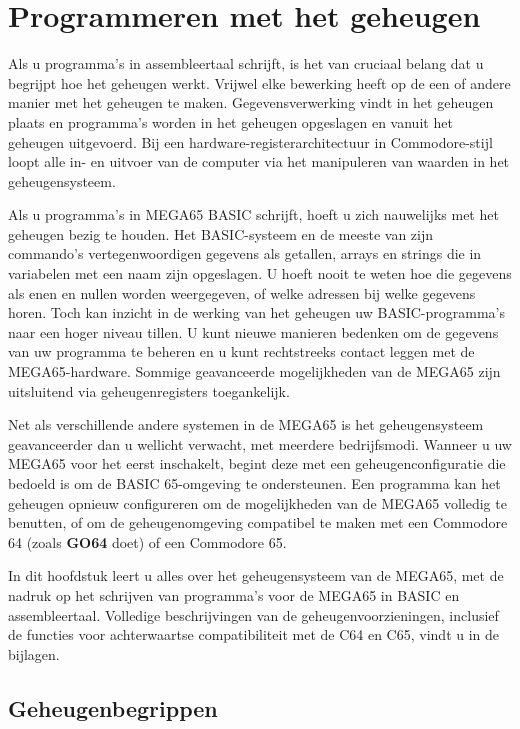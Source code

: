 
\chapter{Programmeren met het geheugen}
\label{cha:programming-with-memory}

Als u programma's in assembleertaal schrijft, is het van cruciaal belang dat u begrijpt hoe het geheugen werkt. Vrijwel elke bewerking heeft op de een of andere manier met het geheugen te maken. Gegevensverwerking vindt in het geheugen plaats en programma's worden in het geheugen opgeslagen en vanuit het geheugen uitgevoerd. Bij een hardware-registerarchitectuur in Commodore-stijl loopt alle in- en uitvoer van de computer via het manipuleren van waarden in het geheugensysteem.

Als u programma's in MEGA65 BASIC schrijft, hoeft u zich nauwelijks met het geheugen bezig te houden. Het BASIC-systeem en de meeste van zijn commando's vertegenwoordigen gegevens als getallen, arrays en strings die in variabelen met een naam zijn opgeslagen. U hoeft nooit te weten hoe die gegevens als enen en nullen worden weergegeven, of welke adressen bij welke gegevens horen. Toch kan inzicht in de werking van het geheugen uw BASIC-programma's naar een hoger niveau tillen. U kunt nieuwe manieren bedenken om de gegevens van uw programma te beheren en u kunt rechtstreeks contact leggen met de MEGA65-hardware. Sommige geavanceerde mogelijkheden van de MEGA65 zijn uitsluitend via geheugenregisters toegankelijk.

Net als verschillende andere systemen in de MEGA65 is het geheugensysteem geavanceerder dan u wellicht verwacht, met meerdere bedrijfsmodi. Wanneer u uw MEGA65 voor het eerst inschakelt, begint deze met een geheugenconfiguratie die bedoeld is om de BASIC 65-omgeving te ondersteunen. Een programma kan het geheugen opnieuw configureren om de mogelijkheden van de MEGA65 volledig te benutten, of om de geheugenomgeving compatibel te maken met een Commodore 64 (zoals \textbf{GO64} doet) of een Commodore 65.

In dit hoofdstuk leert u alles over het geheugensysteem van de MEGA65, met de nadruk op het schrijven van programma's voor de MEGA65 in BASIC en assembleertaal. Volledige beschrijvingen van de geheugenvoorzieningen, inclusief de functies voor achterwaartse compatibiliteit met de C64 en C65, vindt u in de bijlagen.

\newpage
\section{Geheugenbegrippen}
\label{sec:programming-with-memory-concepts}

